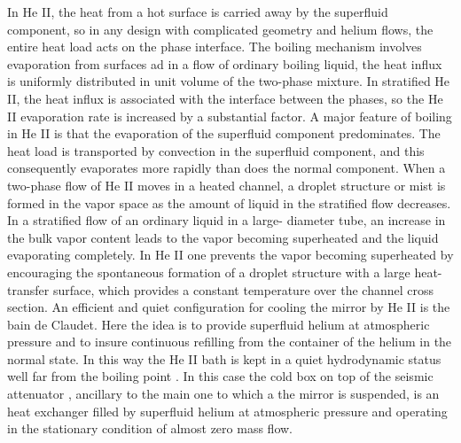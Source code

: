 In He II, the heat from a hot surface is carried away by the superfluid component, so in any design with complicated geometry and helium flows, the entire heat load acts on the phase interface. The boiling mechanism involves evaporation from surfaces ad in a flow of ordinary boiling liquid, the heat influx is uniformly distributed in unit volume of the two-phase mixture. In stratified He II, the heat influx is associated with the interface between the phases, so the He II evaporation rate is increased by a substantial factor. A major feature of boiling in He II is that the evaporation of the superfluid component predominates. The heat load is transported by convection in the superfluid component, and this consequently evaporates more rapidly than does the normal component.
When a two-phase flow of He II moves in a heated channel, a droplet structure or mist is formed in the vapor space as the amount of liquid in the stratified flow decreases. In a stratified flow of an ordinary liquid in a large- diameter tube, an increase in the bulk vapor content leads to the vapor becoming superheated and the liquid evaporating completely. In He II one prevents the vapor becoming superheated by encouraging the spontaneous formation of a droplet structure with a large heat-transfer surface, which provides a constant temperature over the channel cross section.
An efficient and quiet configuration for cooling the mirror by He II is the bain de Claudet. Here the idea is to provide superfluid helium at atmospheric pressure and to insure continuous refilling from the container of the helium in the normal state. In this way the He II bath is kept in a quiet hydrodynamic status well far from the boiling point . In this case the cold box on top of the seismic attenuator , ancillary to the main one  to which a the mirror is suspended, is an heat exchanger filled by superfluid helium at atmospheric pressure and operating in the stationary condition of almost zero mass flow.







